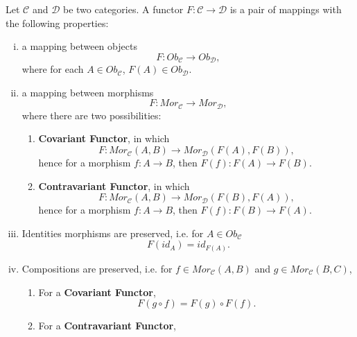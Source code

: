 \begin{definition}[Functor]
	Let $\mathcal C$ and $\mathcal D$ be two categories. A functor $F: \mathcal C \to \mathcal D$ is
	a pair of mappings with the following properties:
	\begin{enumerate}[(i)]
		\item a mapping between objects
		      \begin{displaymath}
			      F:Ob_\mathcal C \to Ob_\mathcal D,
		      \end{displaymath}
		      where for each $A \in Ob_\mathcal C$, $F(A) \in Ob_\mathcal D$.
		\item a mapping between morphisms
		      \begin{displaymath}
			      F:Mor_\mathcal C \to Mor_\mathcal D,
		      \end{displaymath}
		      where there are two possibilities:
		      \begin{enumerate}
			      \item \textbf{Covariant Functor}, in which
			            \begin{displaymath}
				            F:Mor_\mathcal C(A,B) \to Mor_\mathcal D (F(A),F(B)),
			            \end{displaymath}
			            hence for a morphism $f:A \to B$, then $F(f):F(A) \to F(B)$.
			      \item \textbf{Contravariant Functor}, in which
			            \begin{displaymath}
				            F:Mor_\mathcal C(A,B) \to Mor_\mathcal D (F(B),F(A)),
			            \end{displaymath}
			            hence for a morphism $f:A \to B$, then $F(f):F(B) \to F(A)$.
		      \end{enumerate}
		\item Identities morphisms are preserved, i.e. for $A \in Ob_\mathcal C$
		      \begin{displaymath}
			      F(id_A) =  id_{F(A)}.
		      \end{displaymath}
		\item Compositions are preserved, i.e. for $f \in Mor_\mathcal C(A,B)$
		      and $ g \in Mor_\mathcal C(B,C)$,
		      \begin{enumerate}
			      \item For a \textbf{Covariant Functor},
			            \begin{displaymath}
				            F(g \circ f) = F(g) \circ F(f).
			            \end{displaymath}
			      \item For a \textbf{Contravariant Functor},

\end{enumerate}
\end{enumerate}
\end{definition}
